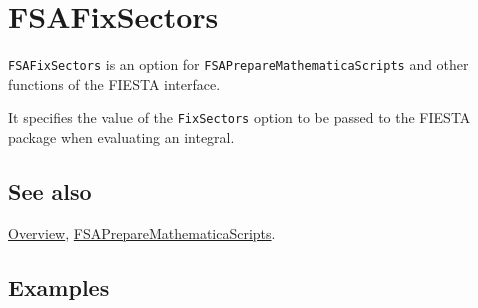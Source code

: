 \documentclass[../FeynHelpersManual.tex]{subfiles}
\begin{document}
\hypertarget{fsafixsectors}{
\section{FSAFixSectors}\label{fsafixsectors}}

\texttt{FSAFixSectors} is an option for
\texttt{FSAPrepareMathematicaScripts} and other functions of the FIESTA
interface.

It specifies the value of the \texttt{FixSectors} option to be passed to
the FIESTA package when evaluating an integral.

\subsection{See also}

\hyperlink{toc}{Overview},
\hyperlink{fsapreparemathematicascripts}{FSAPrepareMathematicaScripts}.

\subsection{Examples}
\end{document}
